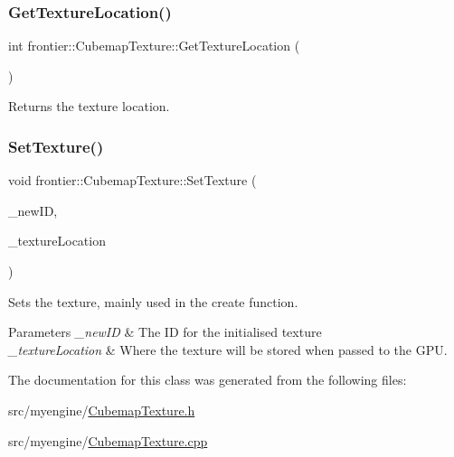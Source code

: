\mbox{\label{classfrontier_1_1_cubemap_texture_a091f7bd4e5233e5ce5f034ca17588387}} 
\subsubsection{\texorpdfstring{Get\+Texture\+Location()}{GetTextureLocation()}}
{\footnotesize\ttfamily int frontier\+::\+Cubemap\+Texture\+::\+Get\+Texture\+Location (\begin{DoxyParamCaption}{ }\end{DoxyParamCaption})}



Returns the texture location. 

\mbox{\label{classfrontier_1_1_cubemap_texture_aec96f85e22f9bc68815721f437d6df7f}} 
\subsubsection{\texorpdfstring{Set\+Texture()}{SetTexture()}}
{\footnotesize\ttfamily void frontier\+::\+Cubemap\+Texture\+::\+Set\+Texture (\begin{DoxyParamCaption}\item[{G\+Luint}]{\+\_\+new\+ID,  }\item[{int}]{\+\_\+texture\+Location }\end{DoxyParamCaption})}



Sets the texture, mainly used in the create function. 


\begin{DoxyParams}{Parameters}
{\em \+\_\+new\+ID} & The ID for the initialised texture \\
\hline
{\em \+\_\+texture\+Location} & Where the texture will be stored when passed to the G\+PU. \\
\hline
\end{DoxyParams}


The documentation for this class was generated from the following files\+:\begin{DoxyCompactItemize}
\item 
src/myengine/\hyperlink{_cubemap_texture_8h}{Cubemap\+Texture.\+h}\item 
src/myengine/\hyperlink{_cubemap_texture_8cpp}{Cubemap\+Texture.\+cpp}\end{DoxyCompactItemize}
